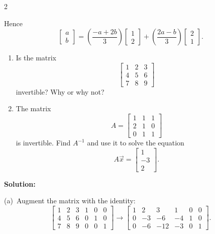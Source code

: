 \documentclass[8pt]{extarticle}
\begin{document}
\begin{multicols}{2}
\begin{tcolorbox}[title=Problem 11 — Original Statement and Solution]
Hence
\[
\begin{bmatrix}a\\b\end{bmatrix}
= \left(\frac{-a + 2b}{3}\right)
\begin{bmatrix}1\\2\end{bmatrix}
+ \left(\frac{2a - b}{3}\right)
\begin{bmatrix}2\\1\end{bmatrix}.
\]
\end{tcolorbox}

\begin{tcolorbox}[title=Problem 12 — Original Statement and Solution]
\noindent
\begin{enumerate}
\item[(a)] Is the matrix
\[
\begin{bmatrix}
1 & 2 & 3\\
4 & 5 & 6\\
7 & 8 & 9
\end{bmatrix}
\]
invertible? Why or why not?

\item[(b)] The matrix
\[
A =
\begin{bmatrix}
1 & 1 & 1\\
2 & 1 & 0\\
0 & 1 & 1
\end{bmatrix}
\]
is invertible. Find \(A^{-1}\) and use it to solve the equation
\[
A\vec{x} =
\begin{bmatrix}
1\\ -3\\ 2
\end{bmatrix}.
\]
\end{enumerate}

\bigskip
\noindent
\textbf{Solution:}

\bigskip
\noindent
(a)\,
Augment the matrix with the identity:
\[
\left[
\begin{array}{ccc|ccc}
1 & 2 & 3 & 1 & 0 & 0\\
4 & 5 & 6 & 0 & 1 & 0\\
7 & 8 & 9 & 0 & 0 & 1
\end{array}
\right]
\to
\left[
\begin{array}{ccc|ccc}
1 & 2 & 3 & 1 & 0 & 0\\
0 & -3 & -6 & -4 & 1 & 0\\
0 & -6 & -12 & -3 & 0 & 1
\end{array}
\right].
\]


\end{tcolorbox}
\end{multicols}
\end{document}
